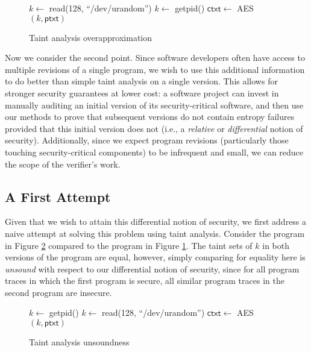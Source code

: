 \documentclass[letterpaper,twocolumn,10pt]{article}
\begin{document}
\begin{figure}
    \caption{Taint analysis overapproximation}
    \label{fig:prog1}
    \begin{center}
    \begin{algorithmic}
        
        \State $k \gets$ \textsf{read(128, ``/dev/urandom'')}
        \Else
        \State $k \gets$ \textsf{getpid()}
        \EndIf
        \State $\mathsf{ctxt} \gets $ \textsf{AES}$(k,\mathsf{ptxt})$
    \end{algorithmic}
\end{center}
\end{figure}

Now we consider the second point. Since software developers often have access to multiple revisions of a single program, we wish to use this additional information
to do better than simple taint analysis on a single version. This allows for stronger security guarantees at lower cost: a software project can invest
in manually auditing an initial version of its security-critical software, and then use our methods to prove that subsequent versions do not contain entropy
failures provided that this initial version does not (i.e., a \emph{relative} or \emph{differential} notion of security). Additionally, since we expect
program revisions (particularly those touching security-critical components) to be infrequent and small, we can reduce the scope of the verifier's work.

\subsection{A First Attempt}

Given that we wish to attain this differential notion of security, we first address a naive attempt at solving this problem using taint analysis.
Consider the program in Figure \ref{fig:prog2} compared to the program in Figure \ref{fig:prog1}. The taint sets of $k$ in both versions of the program
are equal, however, simply comparing for equality here is \emph{unsound} with respect to our differential notion of security, since for all program traces
in which the first program is secure, all similar program traces in the second program are insecure.

\begin{figure}
    \caption{Taint analysis unsoundness}
    \label{fig:prog2}
    \begin{center}
    \begin{algorithmic}
        \State $k \gets$ \textsf{getpid()}
        \Else
        \State $k \gets$ \textsf{read(128, ``/dev/urandom'')}
        \EndIf
        \State $\mathsf{ctxt} \gets $ \textsf{AES}$(k,\mathsf{ptxt})$
    \end{algorithmic}
\end{center}
\end{figure}
\end{document}

